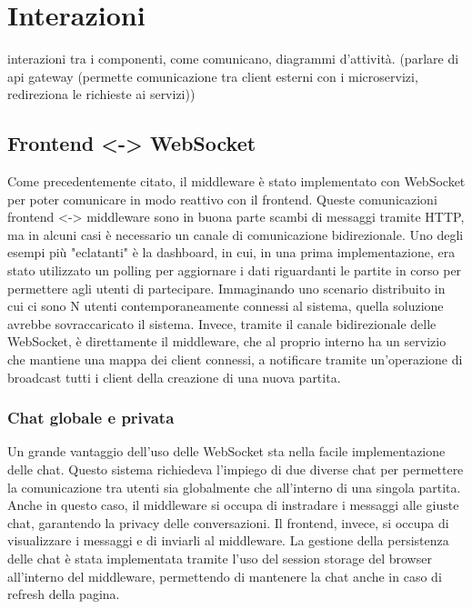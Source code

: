 \chapter{Interazioni}
\label{ch:interazioni} %
interazioni tra i componenti, come comunicano, diagrammi d'attività.
(parlare di api gateway (permette comunicazione tra client esterni con i microservizi, redireziona le richieste ai servizi))

\section{Frontend <-> WebSocket} 

Come precedentemente citato, il middleware è stato implementato con WebSocket per poter comunicare in modo reattivo con il frontend. Queste comunicazioni frontend <-> middleware sono in buona parte scambi di messaggi tramite HTTP, ma in alcuni casi è necessario un canale di comunicazione bidirezionale. Uno degli esempi più "eclatanti" è la dashboard, in cui, in una prima implementazione, era stato utilizzato un polling per aggiornare i dati riguardanti le partite in corso per permettere agli utenti di partecipare. Immaginando uno scenario distribuito in cui ci sono N utenti contemporaneamente connessi al sistema, quella soluzione avrebbe sovraccaricato il sistema. Invece, tramite il canale bidirezionale delle WebSocket, è direttamente il middleware, che al proprio interno ha un servizio che mantiene una mappa dei client connessi, a notificare tramite un'operazione di broadcast tutti i client della creazione di una nuova partita.

\subsection{Chat globale e privata}

Un grande vantaggio dell'uso delle WebSocket sta nella facile implementazione delle chat. Questo sistema richiedeva l'impiego di due diverse chat per permettere la comunicazione tra utenti sia globalmente che all'interno di una singola partita. 
Anche in questo caso, il middleware si occupa di instradare i messaggi alle giuste chat, garantendo la privacy delle conversazioni. Il frontend, invece, si occupa di visualizzare i messaggi e di inviarli al middleware. La gestione della persistenza delle chat è stata implementata tramite l'uso del session storage del browser all'interno del middleware, permettendo di mantenere la chat anche in caso di refresh della pagina.

